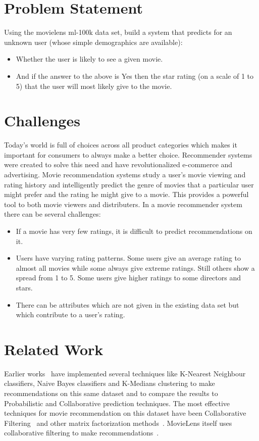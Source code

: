 \documentclass[pdftex,12pt,a4paper]{article}
\begin{document}
	
	
	\tableofcontents
	\newpage
	
	\section{Problem Statement}
		Using the movielens ml-100k data set, build a system that predicts for an unknown user (whose simple demographics are
available):
		\begin{itemize}
			\item Whether the user is likely to see a given movie.
			\item And if the answer to the above is Yes then the star rating (on a scale of 1 to 5) that the user will most likely give to the movie.
		\end{itemize}
	
	\section{Challenges}
		Today's world is full of choices across all product categories which makes it important for consumers to always make a better choice. Recommender systems were created to solve this need and have revolutionalized e-commerce and advertising. Movie recommendation systems study a user's movie viewing and rating history and intelligently predict the genre of movies that a particular user might prefer and the rating he might give to a movie. This provides a powerful tool to both movie viewers and distributers. In a movie recommender system there can be several challenges:
		\begin{itemize}
			\item If a movie has very few ratings, it is difficult to predict recommendations on it.
			\item Users have varying rating patterns. Some users give an average rating to almost all movies while some always give extreme ratings. Still others show a spread from 1 to 5. Some users give higher ratings to some directors and stars.
			\item There can be attributes which are not given in the existing data set but which contribute to a user's rating.
		\end{itemize}
	
	\section{Related Work}
		Earlier works~\cite{Schein2002,MarlinThesis2004} have implemented several techniques like K-Nearest Neighbour classifiers, Naive Bayes classifiers and K-Medians clustering to make recommendations on this same dataset and to compare the results to Probabilistic and Collaborative prediction techniques. The most effective techniques for movie recommendation on this dataset have been Collaborative Filtering~\cite{Sarwar2001,Agarwal2009} and other matrix factorization methods~\cite{CoTriFactor2009}. MovieLens itself uses collaborative filtering to make recommendations~\cite{Herlocker1999}.
	
\end{document}
